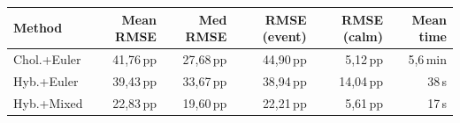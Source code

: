 \begin{tabular}{l r r r r r}
  \toprule
  \textbf{Method} & \textbf{Mean RMSE} & \textbf{Med RMSE} & \textbf{RMSE (event)} & \textbf{RMSE (calm)} & \textbf{Mean time} \\
  \midrule
  Chol.+Euler & 41,76\,pp & 27,68\,pp & 44,90\,pp & 5,12\,pp & 5,6\,min \\
  Hyb.+Euler & 39,43\,pp & 33,67\,pp & 38,94\,pp & 14,04\,pp & 38\,s \\
  Hyb.+Mixed & 22,83\,pp & 19,60\,pp & 22,21\,pp & 5,61\,pp & 17\,s \\
  \bottomrule
\end{tabular}